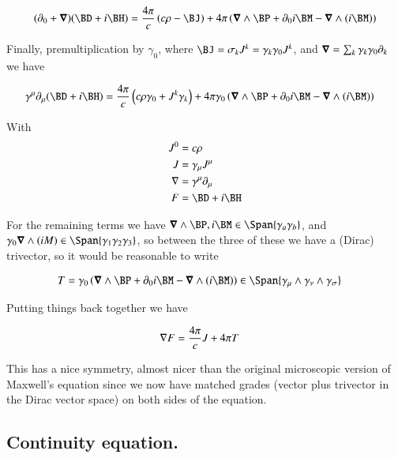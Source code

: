 \begin{align*}
(\partial_0 + \spacegrad)(\BD + i\BH ) &= 
\frac{4 \pi}{c} \left( c \rho - \BJ \right)
+ {4 \pi} \left( \spacegrad \wedge \BP + \partial_0 { i \BM }  - \spacegrad \wedge (i\BM) \right)
\\
\end{align*}

Finally, premultiplication by $\gamma_0$, where $\BJ = \sigma_k J^k = \gamma_k \gamma_0 J^k$, and $\boldsymbol{\nabla} = \sum_k \gamma_k \gamma_0 \partial_k$ we have

\begin{align}
\gamma^\mu \partial_\mu (\BD + i \BH)
&=
\frac{4 \pi}{c} \left( c \rho \gamma_0 + J^k \gamma_k \right)
+ {4 \pi \gamma_0} \left( \spacegrad \wedge \BP + \partial_0 { i \BM }  - \spacegrad \wedge (i\BM) \right)
\end{align}

With 
\begin{align}
J^0 &= c \rho \\
J &= \gamma_\mu J^\mu \\
\grad &= \gamma^\mu \partial_\mu \\
F &= \BD + i\BH
\end{align}

For the remaining terms we have $\spacegrad \wedge \BP, i\BM \in \Span\{\gamma_a \gamma_b\}$, and $\gamma_0 \spacegrad \wedge (iM) \in \Span{ \gamma_1 \gamma_2 \gamma_3}$, so between the three of these we have a (Dirac) trivector, so it would be reasonable to write

\begin{align}
T &= {\gamma_0} \left( \spacegrad \wedge \BP + \partial_0 { i \BM }  - \spacegrad \wedge (i\BM) \right) \in \Span\{ \gamma_\mu \wedge \gamma_\nu \wedge \gamma_\sigma\} 
\end{align}

Putting things back together we have

\begin{align}
\nabla F &= \frac{4\pi}{c} J + 4\pi T
\end{align}

This has a nice symmetry, almost nicer than the original microscopic version of Maxwell's equation since we now have matched grades (vector plus trivector in the Dirac vector space) on both sides of the equation.

\subsection{Continuity equation. }

